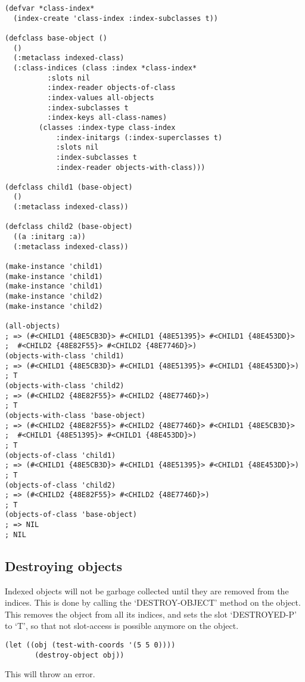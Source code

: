 \begin{Verbatim}[fontsize=\small,frame=leftline,framerule=0.9mm,rulecolor=\color{gray},framesep=5.1mm,xleftmargin=5mm,fontfamily=cmtt]
(defvar *class-index*
  (index-create 'class-index :index-subclasses t))

(defclass base-object ()
  ()
  (:metaclass indexed-class)
  (:class-indices (class :index *class-index*
          :slots nil
          :index-reader objects-of-class
          :index-values all-objects
          :index-subclasses t
          :index-keys all-class-names)
        (classes :index-type class-index
            :index-initargs (:index-superclasses t)
            :slots nil
            :index-subclasses t
            :index-reader objects-with-class)))

(defclass child1 (base-object)
  ()
  (:metaclass indexed-class))

(defclass child2 (base-object)
  ((a :initarg :a))
  (:metaclass indexed-class))

(make-instance 'child1)
(make-instance 'child1)
(make-instance 'child1)
(make-instance 'child2)
(make-instance 'child2)

(all-objects)
; => (#<CHILD1 {48E5CB3D}> #<CHILD1 {48E51395}> #<CHILD1 {48E453DD}>
;  #<CHILD2 {48E82F55}> #<CHILD2 {48E7746D}>)
(objects-with-class 'child1)
; => (#<CHILD1 {48E5CB3D}> #<CHILD1 {48E51395}> #<CHILD1 {48E453DD}>)
; T
(objects-with-class 'child2)
; => (#<CHILD2 {48E82F55}> #<CHILD2 {48E7746D}>)
; T
(objects-with-class 'base-object)
; => (#<CHILD2 {48E82F55}> #<CHILD2 {48E7746D}> #<CHILD1 {48E5CB3D}>
;  #<CHILD1 {48E51395}> #<CHILD1 {48E453DD}>)
; T
(objects-of-class 'child1)
; => (#<CHILD1 {48E5CB3D}> #<CHILD1 {48E51395}> #<CHILD1 {48E453DD}>)
; T
(objects-of-class 'child2)
; => (#<CHILD2 {48E82F55}> #<CHILD2 {48E7746D}>)
; T
(objects-of-class 'base-object)
; => NIL
; NIL
\end{Verbatim}


\subsection{ Destroying objects}

Indexed objects will not be garbage collected until they are
removed from the indices. This is done by calling the
`DESTROY-OBJECT' method on the object. This removes the object
from all its indices, and sets the slot `DESTROYED-P' to `T', so
that not slot-access is possible anymore on the object.

\begin{Verbatim}[fontsize=\small,frame=leftline,framerule=0.9mm,rulecolor=\color{gray},framesep=5.1mm,xleftmargin=5mm,fontfamily=cmtt]
(let ((obj (test-with-coords '(5 5 0))))
       (destroy-object obj))
\end{Verbatim}
This will throw an error.



